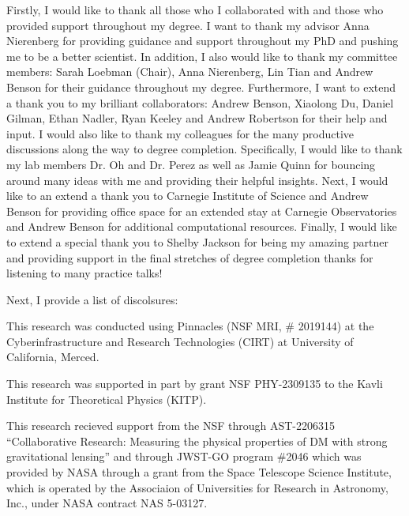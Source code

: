 \documentclass[12pt,chapterheads]{UCMerced}
\begin{document}
\begin{frontmatter}
\tableofcontents
\listoffigures  %
\listoftables   %



\begin{acknowledgements} 

Firstly, I would like to thank all those who I collaborated with and those who provided support throughout my degree. 
I want to thank my advisor Anna Nierenberg for providing guidance and support throughout my PhD and pushing me to be a better scientist. 
In addition, I also would like to thank my committee members: Sarah Loebman (Chair), Anna Nierenberg, Lin Tian and Andrew Benson for their guidance throughout my degree.
Furthermore, I want to extend a thank you to my brilliant collaborators: Andrew Benson, Xiaolong Du, Daniel Gilman, Ethan Nadler, Ryan Keeley and Andrew Robertson for their help and input. 
I would also like to thank my colleagues for the many productive discussions along the way to degree completion. 
Specifically, I would like to thank my lab members Dr. Oh and Dr. Perez as well as Jamie Quinn for bouncing around many ideas with me and providing their helpful insights.
Next, I would like to an extend a thank you to Carnegie Institute of Science and Andrew Benson for providing office space for an extended stay at Carnegie Observatories and Andrew Benson for additional computational resources.
Finally, I would like to extend a special thank you to Shelby Jackson for being my amazing partner and providing support in the final stretches of degree completion thanks for listening to many practice talks! 

Next, I provide a list of discolsures: 

This research was conducted using Pinnacles (NSF MRI, \# 2019144) at the Cyberinfrastructure and Research Technologies (CIRT) at University of California, Merced.

This research was supported in part by grant NSF PHY-2309135 to the Kavli Institute for Theoretical Physics (KITP).

This research recieved support from the NSF through AST-2206315 “Collaborative Research: Measuring the physical properties of DM with strong gravitational lensing” and through JWST-GO program \#2046 which was provided by NASA through a grant from the Space Telescope Science Institute, which is operated by the Associaion of Universities for Research in Astronomy, Inc., under NASA contract NAS 5-03127.


\end{acknowledgements}
\end{frontmatter}
\end{document}
